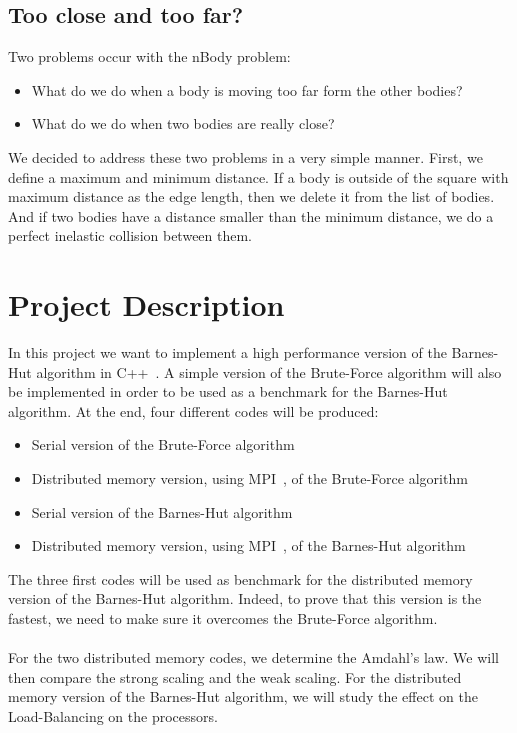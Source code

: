 \documentclass[11pt,a4paper]{article}
\begin{document}
\subsection{Too close and too far?} 
Two problems occur with the nBody problem:
\begin{itemize}
\item What do we do when a body is moving too far form the other bodies?
\item What do we do when two bodies are really close? 
\end{itemize} 

We decided to address these two problems in a very simple manner. First, we define a maximum and minimum distance. If a body is outside of the square with maximum distance as the edge length, then we delete it from the list of bodies. And if two bodies have a distance smaller than the minimum distance, we do a perfect inelastic collision between them.

\section{Project Description}

In this project we want to implement a high performance version of the Barnes-Hut algorithm in C++~\cite{c++}. A simple version of the Brute-Force algorithm will also be implemented in order to be used as a benchmark for the Barnes-Hut algorithm. At the end, four different codes will be produced:
\begin{itemize}
\item Serial version of the Brute-Force algorithm
\item Distributed memory version, using MPI~\cite{mpi}, of the Brute-Force algorithm
\item Serial version of the Barnes-Hut algorithm
\item Distributed memory version, using MPI~\cite{mpi}, of the Barnes-Hut algorithm
\end{itemize}
The three first codes will be used as benchmark for the distributed memory version of the Barnes-Hut algorithm. Indeed, to prove that this version is the fastest, we need to make sure it overcomes the Brute-Force algorithm. 
\\\\
For the two distributed memory codes, we determine the Amdahl's law. We will then compare the strong scaling and the weak scaling. For the distributed memory version of the Barnes-Hut algorithm, we will study the effect on the Load-Balancing on the processors. 
\end{document}
